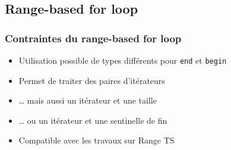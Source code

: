 \documentclass[C++.tex]{subfiles}
\begin{document}
\subsection*{Range-based for loop}
\begin{frame}[fragile]
	\frametitle{Contraintes du range-based for loop}
	\begin{itemize}
		\item Utilisation possible de types différents pour \lstinline|end| et \lstinline|begin|
		\item Permet de traiter des paires d'itérateurs
		\item \ldots{} mais aussi un itérateur et une taille
		\item \ldots{} ou un itérateur et une sentinelle de fin
		\item Compatible avec les travaux sur Range TS
		
	\end{itemize}
\end{frame}
\end{document}

